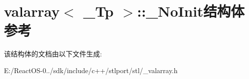 \hypertarget{structvalarray_1_1___no_init}{}\section{valarray$<$ \+\_\+\+Tp $>$\+:\+:\+\_\+\+No\+Init结构体 参考}
\label{structvalarray_1_1___no_init}


该结构体的文档由以下文件生成\+:\begin{DoxyCompactItemize}
\item 
E\+:/\+React\+O\+S-\/0../sdk/include/c++/stlport/stl/\+\_\+valarray.\+h\end{DoxyCompactItemize}

